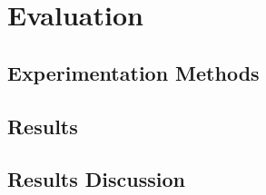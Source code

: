\chapter{Evaluation}

\section{Experimentation Methods}

\section{Results}

\section{Results Discussion}

